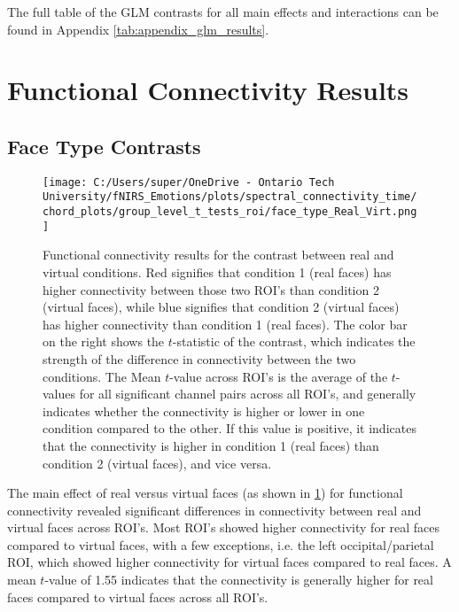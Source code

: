 The full table of the GLM contrasts for all main effects and interactions can be found in Appendix \ref{tab:appendix_glm_results}.

\section{Functional Connectivity Results}
\subsection{Face Type Contrasts}
\begin{figure}[H]
  \centering
  \texttt{[image: C:/Users/super/OneDrive - Ontario Tech University/fNIRS\_Emotions/plots/spectral\_connectivity\_time/chord\_plots/group\_level\_t\_tests\_roi/face\_type\_Real\_Virt.png]}
  \caption[FC: Real vs. Virtual]{Functional connectivity results for the contrast between real and virtual conditions.
  Red signifies that condition 1 (real faces) has higher connectivity between those two ROI's than condition 2 (virtual faces), while blue signifies that condition 2 (virtual faces) has higher connectivity than condition 1 (real faces).
  The color bar on the right shows the $t$-statistic of the contrast, which indicates the strength of the difference in connectivity between the two conditions.
  The Mean $t$-value across ROI's is the average of the $t$-values for all significant channel pairs across all ROI's, and generally indicates whether the connectivity is higher or lower in one condition compared to the other.
  If this value is positive, it indicates that the connectivity is higher in condition 1 (real faces) than condition 2 (virtual faces), and vice versa.}
  \label{fig:fc_real_vs_virtual}
\end{figure}

The main effect of real versus virtual faces (as shown in \ref{fig:fc_real_vs_virtual}) for functional connectivity revealed significant differences in connectivity between real and virtual faces across ROI's.
Most ROI's showed higher connectivity for real faces compared to virtual faces, with a few exceptions, i.e. the left occipital/parietal ROI, which showed higher connectivity for virtual faces compared to real faces.
A mean $t$-value of 1.55 indicates that the connectivity is generally higher for real faces compared to virtual faces across all ROI's. 

